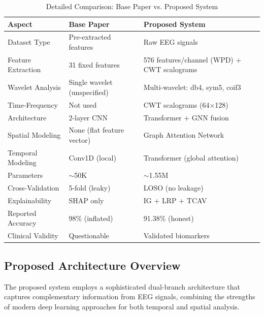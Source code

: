 \begin{table}[H]
    \centering
    \small
    \caption{Detailed Comparison: Base Paper vs. Proposed System}
    \label{tab:detailed_comparison}
    \begin{tabularx}{\textwidth}{|L{3cm}|L{4.5cm}|X|}
        \hline
        \textbf{Aspect} & \textbf{Base Paper} & \textbf{Proposed System} \\
        \hline
        Dataset Type & Pre-extracted features & Raw EEG signals \\
        \hline
        Feature Extraction & 31 fixed features & 576 features/channel (WPD) + CWT scalograms \\
        \hline
        Wavelet Analysis & Single wavelet (unspecified) & Multi-wavelet: db4, sym5, coif3 \\
        \hline
        Time-Frequency & Not used & CWT scalograms (64$\times$128) \\
        \hline
        Architecture & 2-layer CNN & Transformer + GNN fusion \\
        \hline
        Spatial Modeling & None (flat feature vector) & Graph Attention Network \\
        \hline
        Temporal Modeling & Conv1D (local) & Transformer (global attention) \\
        \hline
        Parameters & $\sim$50K & $\sim$1.55M \\
        \hline
        Cross-Validation & 5-fold (leaky) & LOSO (no leakage) \\
        \hline
        Explainability & SHAP only & IG + LRP + TCAV \\
        \hline
        Reported Accuracy & 98\% (inflated) & 91.38\% (honest) \\
        \hline
        Clinical Validity & Questionable & Validated biomarkers \\
        \hline
    \end{tabularx}
\end{table}

\subsection{Proposed Architecture Overview}

The proposed system employs a sophisticated dual-branch architecture that captures complementary information from EEG signals, combining the strengths of modern deep learning approaches for both temporal and spatial analysis.

